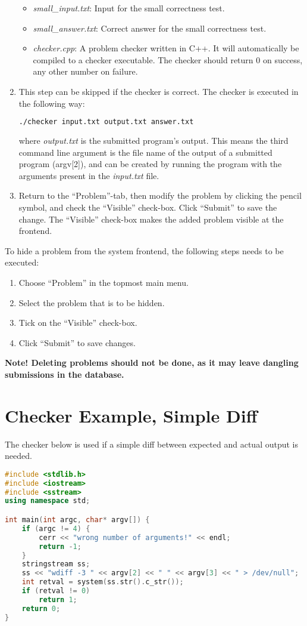 \begin{enumerate}
\begin{itemize}
    \item \textit{small\_input.txt}: Input for the small correctness test.
    \item \textit{small\_answer.txt}: Correct answer for the small correctness test.
    \item \textit{checker.cpp}: A problem checker written in C++. It will automatically be compiled to a checker executable. The checker should return 0 on success, any other number on failure.
  \end{itemize}
  \item This step can be skipped if the checker is correct. The checker is executed in the following way:
  \begin{lstlisting}[language=sh]
  ./checker input.txt output.txt answer.txt
  \end{lstlisting}
  where \textit{output.txt} is the submitted program’s output. This means the third command line argument is the file name of the output of a submitted program (argv[2]), and can be created by running the program with the arguments present in the \textit{input.txt} file.
  \item Return to the ``Problem''-tab, then modify the problem by clicking the pencil symbol, and
  check the ``Visible'' check-box. Click ``Submit'' to save the change. The ``Visible'' check-box makes the added problem visible at the frontend.
\end{enumerate}

To hide a problem from the system frontend, the following steps needs to be executed:
\begin{enumerate}
  \item Choose ``Problem'' in the topmost main menu.
  \item Select the problem that is to be hidden.
  \item Tick on the ``Visible'' check-box.
  \item Click ``Submit'' to save changes.
\end{enumerate}
\textbf{Note! Deleting problems should not be done, as it may leave dangling submissions in the database.}

\section{Checker Example, Simple Diff}
\label{sec:checker-simple}
The checker below is used if a simple diff between expected and actual output is needed.
\begin{lstlisting}[language=c++]
#include <stdlib.h>
#include <iostream>
#include <sstream>
using namespace std;

int main(int argc, char* argv[]) {
	if (argc != 4) {
		cerr << "wrong number of arguments!" << endl;
		return -1;
	}
	stringstream ss;
	ss << "wdiff -3 " << argv[2] << " " << argv[3] << " > /dev/null";
	int retval = system(ss.str().c_str());
	if (retval != 0)
		return 1;
	return 0;
}
\end{lstlisting}


